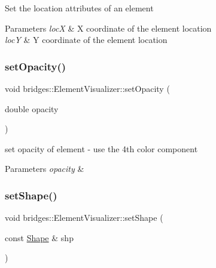 Set the location attributes of an element


\begin{DoxyParams}{Parameters}
{\em locX} & X coordinate of the element location \\
\hline
{\em locY} & Y coordinate of the element location \\
\hline
\end{DoxyParams}
\mbox{\label{classbridges_1_1_element_visualizer_a8f77db4a2774021aec4ab8ea18e50fc9}} 
\subsubsection{\texorpdfstring{set\+Opacity()}{setOpacity()}}
{\footnotesize\ttfamily void bridges\+::\+Element\+Visualizer\+::set\+Opacity (\begin{DoxyParamCaption}\item[{double}]{opacity }\end{DoxyParamCaption})\hspace{0.3cm}{\ttfamily [inline]}}

set opacity of element -\/ use the 4th color component


\begin{DoxyParams}{Parameters}
{\em opacity} & \\
\hline
\end{DoxyParams}
\mbox{\label{classbridges_1_1_element_visualizer_af81cc20423f2fedffa81fb7c473a1179}} 
\subsubsection{\texorpdfstring{set\+Shape()}{setShape()}}
{\footnotesize\ttfamily void bridges\+::\+Element\+Visualizer\+::set\+Shape (\begin{DoxyParamCaption}\item[{const \mbox{\hyperlink{namespacebridges_a1b4050586bd708782ae0d4f3b06b9579}{Shape}} \&}]{shp }\end{DoxyParamCaption})\hspace{0.3cm}{\ttfamily [inline]}}

